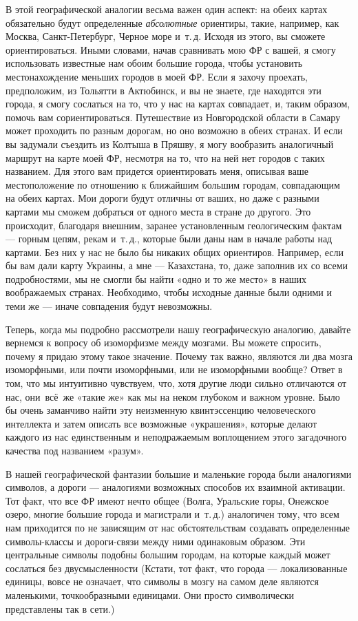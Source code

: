 \documentclass[../main.tex]{subfiles}
\begin{document}
В этой географической аналогии весьма важен один аспект: на обеих картах обязательно будут определенные \emph{абсолютные} ориентиры, такие, например, как Москва, Санкт-Петербург, Черное море и~т.\,д. Исходя из этого, вы сможете ориентироваться. Иными словами, начав сравнивать мою ФР с вашей, я смогу использовать известные нам обоим большие города, чтобы установить местонахождение меньших городов в моей ФР\@. Если я захочу проехать, предположим, из Тольятти в Актюбинск, и вы не знаете, где находятся эти города, я смогу сослаться на то, что у нас на картах совпадает, и, таким образом, помочь вам сориентироваться. Путешествие из Новгородской области в Самару может проходить по разным дорогам, но оно возможно в обеих странах. И если вы задумали съездить из Колтыша в Пряшву, я могу вообразить аналогичный маршрут на карте моей ФР, несмотря на то, что на ней нет городов с таких названием. Для этого вам придется ориентировать меня, описывая ваше местоположение по отношению к ближайшим большим городам, совпадающим на обеих картах. Мои дороги будут отличны от ваших, но даже с разными картами мы сможем добраться от одного места в стране до другого. Это происходит, благодаря внешним, заранее установленным геологическим фактам --- горным цепям, рекам и~т.\,д., которые были даны нам в начале работы над картами. Без них у нас не было бы никаких общих ориентиров. Например, если бы вам дали карту Украины, а мне --- Казахстана, то, даже заполнив их со всеми подробностями, мы не смогли бы найти «одно и то же место» в наших воображаемых странах. Необходимо, чтобы исходные данные были одними и теми же --- иначе совпадения будут невозможны.

Теперь, когда мы подробно рассмотрели нашу географическую аналогию, давайте вернемся к вопросу об изоморфизме между мозгами. Вы можете спросить, почему я придаю этому такое значение. Почему так важно, являются ли два мозга изоморфными, или почти изоморфными, или не изоморфными вообще? Ответ в том, что мы интуитивно чувствуем, что, хотя другие люди сильно отличаются от нас, они~всё~же «такие же» как мы на неком глубоком и важном уровне. Было бы очень заманчиво найти эту неизменную квинтэссенцию человеческого интеллекта и затем описать все возможные «украшения», которые делают каждого из нас единственным и неподражаемым воплощением этого загадочного качества под названием «разум».

В нашей географической фантазии большие и маленькие города были аналогиями символов, а дороги --- аналогиями возможных способов их взаимной активации. Тот факт, что все ФР имеют нечто общее (Волга, Уральские горы, Онежское озеро, многие большие города и магистрали и~т.\,д.) аналогичен тому, что всем нам приходится по не зависящим от нас обстоятельствам создавать определенные символы-классы и дороги-связи между ними одинаковым образом. Эти центральные символы подобны большим городам, на которые каждый может сослаться без двусмысленности (Кстати, тот факт, что города --- локализованные единицы, вовсе не означает, что символы в мозгу на самом деле являются маленькими, точкообразными единицами. Они просто символически представлены так в сети.)
\end{document}
